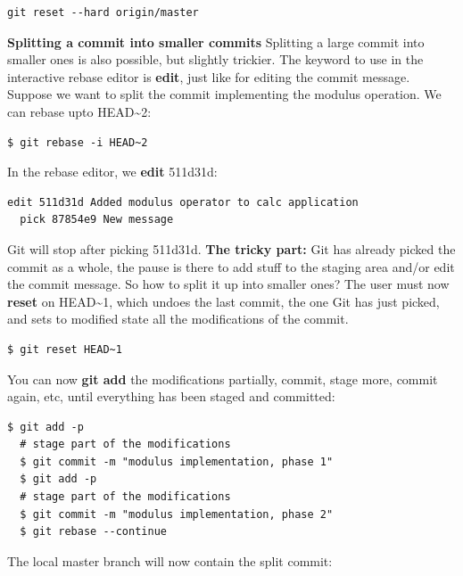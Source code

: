 \documentclass[a4paper]{../../common/tufte-latex/tufte-handout}
\begin{document}
\begin{lstlisting}[style=BashInputStyle]
  git reset --hard origin/master
\end{lstlisting}

\noindent \textbf{Splitting a commit into smaller commits}
Splitting a large commit into smaller ones is also possible, but slightly trickier.
The keyword to use in the interactive rebase editor is \textbf{edit}, just like for editing the commit message.
Suppose we want to split the commit implementing the modulus operation.
We can rebase upto HEAD\textasciitilde2:

\begin{lstlisting}[style=BashInputStyle]
  $ git rebase -i HEAD~2
\end{lstlisting}

In the rebase editor, we \textbf{edit} 511d31d:
\begin{lstlisting}[style=BashInputStyle]
  edit 511d31d Added modulus operator to calc application
  pick 87854e9 New message
\end{lstlisting}

Git will stop after picking 511d31d.
\textbf{The tricky part:} Git has already picked the commit as a whole, the pause is there to add stuff to the staging area and/or edit the commit message.
So how to split it up into smaller ones?
The user must now \textbf{reset} on HEAD\textasciitilde1, which undoes the last commit, the one Git has just picked, and sets to modified state all the modifications of the commit.

\begin{lstlisting}[style=BashInputStyle]
  $ git reset HEAD~1
\end{lstlisting}

You can now \textbf{git add} the modifications partially, commit, stage more, commit again, etc, until everything has been staged and committed:

\begin{lstlisting}[style=BashInputStyle]
  $ git add -p
  # stage part of the modifications
  $ git commit -m "modulus implementation, phase 1"
  $ git add -p
  # stage part of the modifications
  $ git commit -m "modulus implementation, phase 2"
  $ git rebase --continue
\end{lstlisting}

The local master branch will now contain the split commit:
\end{document}
